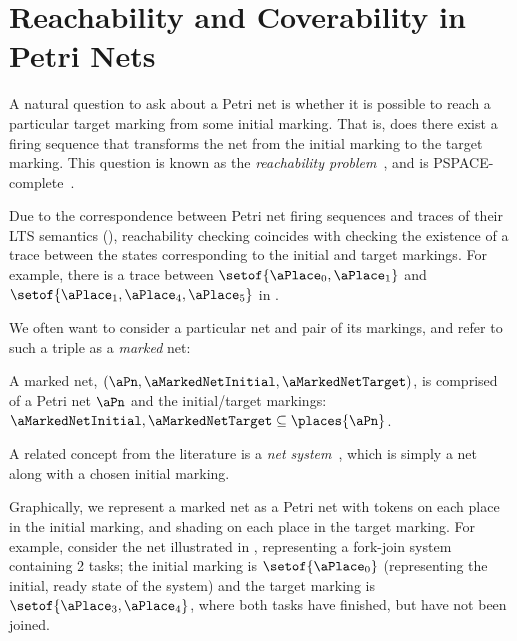 \section{Reachability and Coverability in Petri Nets}

A natural question to ask about a Petri net is whether it is possible to reach
a particular target marking from some initial marking. That is, does there
exist a firing sequence that transforms the net from the initial marking to the
target marking. This question is known as the \emph{reachability
problem}~\cite{Peterson1977}, and is PSPACE-complete~\cite{Cheng1995}.

Due to the correspondence between Petri net firing sequences and traces of
their LTS semantics (), reachability
checking coincides with checking the existence of a trace between the states
corresponding to the initial and target markings. For example, there is a
trace between $\setof{\aPlace_0,\aPlace_1}$ and
$\setof{\aPlace_1,\aPlace_4,\aPlace_5}$ in
.

We often want to consider a particular net and pair of its markings, and refer
to such a triple as a \emph{marked} net:
\begin{definition}
    A marked net, $(\aPn, \aMarkedNetInitial, \aMarkedNetTarget)$, is comprised
    of a Petri net $\aPn$ and the initial/target markings:
    $\aMarkedNetInitial,\aMarkedNetTarget \subseteq \places{\aPn}$.
\end{definition}

A related concept from the literature is a \emph{net
system}~\cite{Engelfriet1998}, which is simply a net along with a chosen
initial marking.

Graphically, we represent a marked net as a Petri net with tokens on each place
in the initial marking, and shading on each place in the target marking. For
example, consider the net illustrated in , representing
a fork-join system containing 2 tasks; the initial marking is $\setof{\aPlace_0}$
(representing the initial, ready state of the system) and the target marking is
$\setof{\aPlace_3,\aPlace_4}$, where both tasks have finished, but have not
been joined.

